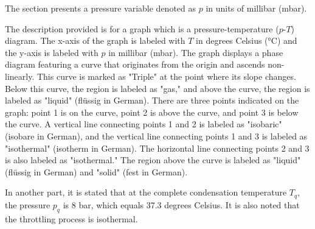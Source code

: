 The section presents a pressure variable denoted as \( p \) in units of millibar (mbar).

The description provided is for a graph which is a pressure-temperature (\( p \)-\( T \)) diagram. The x-axis of the graph is labeled with \( T \) in degrees Celsius (°C) and the y-axis is labeled with \( p \) in millibar (mbar). The graph displays a phase diagram featuring a curve that originates from the origin and ascends non-linearly. This curve is marked as "Triple" at the point where its slope changes. Below this curve, the region is labeled as "gas," and above the curve, the region is labeled as "liquid" (flüssig in German). There are three points indicated on the graph: point 1 is on the curve, point 2 is above the curve, and point 3 is below the curve. A vertical line connecting points 1 and 2 is labeled as "isobaric" (isobare in German), and the vertical line connecting points 1 and 3 is labeled as "isothermal" (isotherm in German). The horizontal line connecting points 2 and 3 is also labeled as "isothermal." The region above the curve is labeled as "liquid" (flüssig in German) and "solid" (fest in German).

In another part, it is stated that at the complete condensation temperature \( T_q \), the pressure \( p_q \) is 8 bar, which equals 37.3 degrees Celsius. It is also noted that the throttling process is isothermal.